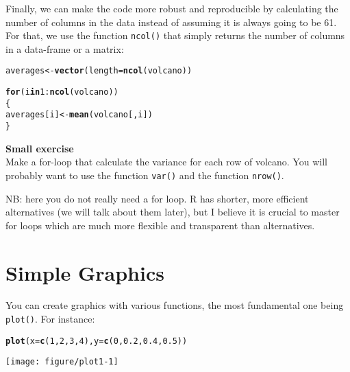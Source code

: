 \documentclass[12pt,a4paper]{scrartcl}\usepackage[]{graphicx}\usepackage[]{color}
\makeatletter
\def\maxwidth{ %
  \ifdim\Gin@nat@width>\linewidth
    \linewidth
  \else
    \Gin@nat@width
  \fi
}
\newcommand{\hlnum}[1]{\textcolor[rgb]{0.686,0.059,0.569}{#1}}%
\newcommand{\hlopt}[1]{\textcolor[rgb]{0,0,0}{#1}}%
\newcommand{\hlstd}[1]{\textcolor[rgb]{0.345,0.345,0.345}{#1}}%
\newcommand{\hlkwa}[1]{\textcolor[rgb]{0.161,0.373,0.58}{\textbf{#1}}}%
\newcommand{\hlkwb}[1]{\textcolor[rgb]{0.69,0.353,0.396}{#1}}%
\newcommand{\hlkwc}[1]{\textcolor[rgb]{0.333,0.667,0.333}{#1}}%
\newcommand{\hlkwd}[1]{\textcolor[rgb]{0.737,0.353,0.396}{\textbf{#1}}}%
\newenvironment{kframe}{%
 \def\at@end@of@kframe{}%
 \ifinner\ifhmode%
  \def\at@end@of@kframe{\end{minipage}}%
  \begin{minipage}{\columnwidth}%
 \fi\fi%
 \def\FrameCommand##1{\hskip\@totalleftmargin \hskip-\fboxsep
 \colorbox{shadecolor}{##1}\hskip-\fboxsep
     \hskip-\linewidth \hskip-\@totalleftmargin \hskip\columnwidth}%
 \MakeFramed {\advance\hsize-\width
   \@totalleftmargin\z@ \linewidth\hsize
   \@setminipage}}%
 {\par\unskip\endMakeFramed%
 \at@end@of@kframe}
\newenvironment{knitrout}{}{} %
\makeatother
\begin{document}
Finally, we can make the code more robust and reproducible by calculating the number of columns in the data instead of assuming it is always going to be 61. For that, we use the function \texttt{ncol()} that simply returns the number of columns in a data-frame or a matrix:

\begin{knitrout}
\color{fgcolor}\begin{kframe}
\begin{alltt}
\hlstd{averages} \hlkwb{<-} \hlkwd{vector}\hlstd{(}\hlkwc{length} \hlstd{=} \hlkwd{ncol}\hlstd{(volcano))}

\hlkwa{for} \hlstd{(i} \hlkwa{in} \hlnum{1}\hlopt{:}\hlkwd{ncol}\hlstd{(volcano))}
\hlstd{\{}
  \hlstd{averages[i]} \hlkwb{<-} \hlkwd{mean}\hlstd{( volcano[,i] )}
\hlstd{\}}
\end{alltt}
\end{kframe}
\end{knitrout}

\begin{mdframed}
\textbf{Small exercise}\\
Make a for-loop that calculate the variance for each row of volcano. You will probably want to use the function \texttt{var()} and the function \texttt{nrow()}.

\end{mdframed}

\begin{mdframed}
NB: here you do not really need a for loop. R has shorter, more efficient alternatives (we will talk about them later), but I believe it is crucial to master for loops which are much more flexible and transparent than alternatives.
\end{mdframed}

\section{Simple Graphics}

You can create graphics with various functions, the most fundamental one being \texttt{plot()}.
For instance:

\begin{knitrout}
\color{fgcolor}\begin{kframe}
\begin{alltt}
\hlkwd{plot}\hlstd{(}\hlkwc{x} \hlstd{=} \hlkwd{c}\hlstd{(}\hlnum{1}\hlstd{,}\hlnum{2}\hlstd{,}\hlnum{3}\hlstd{,}\hlnum{4}\hlstd{),} \hlkwc{y}\hlstd{=}\hlkwd{c}\hlstd{(}\hlnum{0}\hlstd{,}\hlnum{0.2}\hlstd{,}\hlnum{0.4}\hlstd{,}\hlnum{0.5}\hlstd{))}
\end{alltt}
\end{kframe}
\texttt{[image: figure/plot1-1]} 

\end{knitrout}
\end{document}
